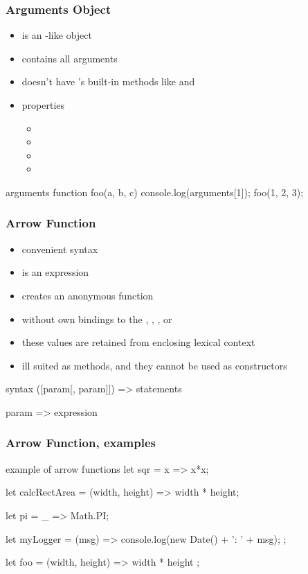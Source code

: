 \begin{frame}[fragile] \frametitle{Arguments Object}
\begin{itemize}
  \item {} is an -like object
  \item contains all arguments
  \item doesn't have 's built-in methods like  and 
  \item properties
  \begin{itemize}
    \item {}
    \item {}
    \item {}
    \item {}
  \end{itemize}
\end{itemize}

\begin{CodeBox}{arguments}
function foo(a, b, c) {
  console.log(arguments[1]);
}
foo(1, 2, 3);
\end{CodeBox}
\end{frame}

\begin{frame}[fragile] \frametitle{Arrow Function}

\begin{itemize}
  \item convenient syntax
  \item is an expression
  \item creates an anonymous function
  \item without own bindings to the , , , or 
  \item these values are retained from enclosing lexical context
  \item ill suited as methods, and they cannot be used as constructors
\end{itemize}
\begin{CodeBox}{syntax}
([param[, param]]) => {
   statements
}

param => expression
\end{CodeBox}
\end{frame}


\begin{frame}[fragile] \frametitle{Arrow Function, examples}

\begin{CodeBox}{example of arrow functions}
let sqr = x => x*x;

let calcRectArea = (width, height) => width * height;

let pi = _ => Math.PI;

let myLogger = (msg) => {
  console.log(new Date() + ': ' + msg); 
};

let foo = (width, height) => { width * height };
\end{CodeBox}
\end{frame}

